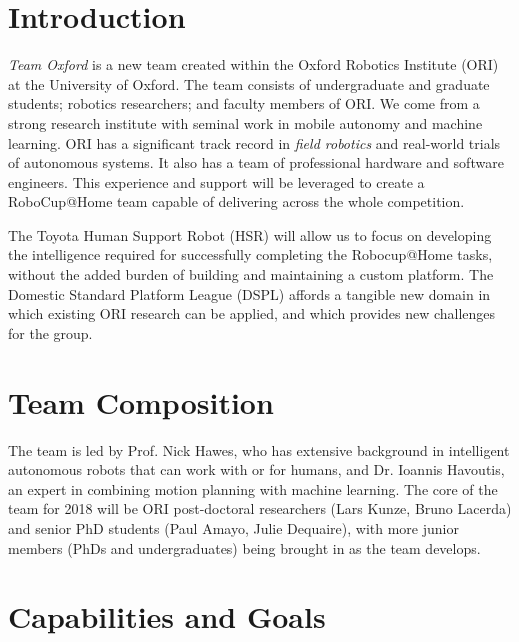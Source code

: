 \documentclass[runningheads,a4paper]{llncs}
\newcommand{\teamori}{Team Oxford}
\begin{document}

\section{Introduction}
\textit{\teamori{}} is a new team created within the Oxford Robotics Institute
(ORI) at the University of Oxford. The team consists of undergraduate and
graduate students; robotics researchers; and faculty members of ORI. We come
from a strong research institute with seminal work in mobile autonomy and
machine learning. ORI has a significant track record in \emph{field robotics}
and real-world trials of autonomous systems. It also has a team of professional
hardware and software engineers. This experience and support will be leveraged
to create a RoboCup@Home team capable of delivering across the whole
competition. 

The Toyota Human Support Robot (HSR) will allow us to focus on developing the
intelligence required for successfully completing the Robocup@Home tasks, 
without the added burden of building and maintaining a custom platform.
The Domestic Standard Platform League (DSPL) affords a tangible new domain in
which existing ORI research can be applied, and which provides new challenges
for the group. 

\section{Team Composition}

The team is led by Prof. Nick Hawes, who has extensive background in
intelligent autonomous robots that can work with or for humans, and Dr. Ioannis Havoutis, an expert in combining motion planning with machine learning. The core of the team for 2018 will be ORI post-doctoral researchers (Lars Kunze, Bruno Lacerda) and senior PhD students (Paul Amayo, Julie Dequaire), with more junior members (PhDs and undergraduates) being brought in as the team develops. 

\section{Capabilities and Goals}
\end{document}
